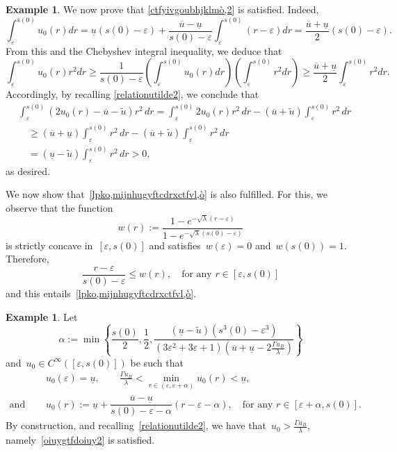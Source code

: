\documentclass[12pt,a4paper,intlimits,sumlimits]{amsart}
\theoremstyle{definition}
\newtheorem{example}[definition]{Example}
\theoremstyle{plain}
\numberwithin{equation}{section}
\renewcommand{\le}{\leqslant}
\renewcommand{\ge}{\geqslant}
\begin{document}
\begin{appendix}
\begin{example}
We now prove that \eqref{ctfyivgoubhjklmò,2} is satisfied.
Indeed,
\[
\int_{\varepsilon}^{s(0)} u_0(r) dr = \underline u (s(0)-\varepsilon) +\dfrac{\overline u-\underline u}{s(0)-\varepsilon}\int_{\varepsilon}^{s(0)} (r-\varepsilon) dr=\dfrac{\overline u +\underline u}{2}(s(0)-\varepsilon).
\]
From this and the Chebyshev integral inequality, we deduce that
\[
\int_{\varepsilon}^{s(0)} u_0(r) r^2 dr\ge\dfrac{1}{s(0)-\varepsilon}\left(\int_{\varepsilon}^{s(0)} u_0(r) dr\right)\left(\int_{\varepsilon}^{s(0)} r^2 dr\right)\ge \dfrac{\overline u +\underline u}{2} \int_{\varepsilon}^{s(0)} r^2 dr.
\]
Accordingly,  by recalling \eqref{relationutilde2}, we conclude that
\[
\begin{split}
&\int_\varepsilon^{s(0)} (2 u_0(r)-\overline{u} -\widetilde u) r^2\, dr = \int_\varepsilon^{s(0)} 2u_0(r) r^2\, dr -(\overline u+\widetilde u)\int_\varepsilon^{s(0)} r^2 \, dr\\
&\quad\ge (\overline u+\underline u)\int_\varepsilon^{s(0)} r^2 \, dr - (\overline u+\widetilde u)\int_\varepsilon^{s(0)} r^2 \, dr\\
&\quad = (\underline u-\widetilde u)\int_\varepsilon^{s(0)} r^2 \, dr>0, 
\end{split}
\]
as desired.

We now show that~\eqref{lpko,mijnhugyftcdrxctfvl,ò} is also fulfilled.
For this, we observe that the function
$$w(r):=\dfrac{1-e^{-\sqrt\lambda(r-\varepsilon)}}{1-e^{-\sqrt\lambda (s(0)-\varepsilon)}}$$ is strictly concave in~$[\varepsilon, s(0)]$ and satisfies~$ w(\varepsilon)=0$ and~$w(s(0))=1$.
Therefore,
$$ \dfrac{r-\varepsilon}{s(0)-\varepsilon}\le w(r), \quad {\mbox{for any }}r\in [\varepsilon, s(0)]$$
and this entails~\eqref{lpko,mijnhugyftcdrxctfvl,ò}.
\end{example}

\begin{example}
Let 
\begin{equation}\label{xfgyucvghjcvhj1}
\alpha:=\min\left\{\frac{s(0)}{2},\frac{1}{2},\frac{(\underline u-\widetilde u)(s^3(0)-\varepsilon^3)}{(3\varepsilon^2+3\varepsilon+1)(\overline u+\underline u-2\frac{\Gamma u_B}{\lambda})}\right\}
\end{equation} and~$u_0\in C^\infty([\varepsilon,s(0)])$ be such that 
\[
\begin{aligned}
&u_0(\varepsilon)=\underline u,
\qquad \frac{\Gamma u_B}{\lambda}<\min_{r\in(\varepsilon,\varepsilon+\alpha)}u_0(r)<\underline u, \\
\mbox{and }\quad & u_0(r):=\underline u +\dfrac{\overline u -\underline u}{s(0)-\varepsilon-\alpha}(r-\varepsilon-\alpha),\quad {\mbox{for any }}
r\in [\varepsilon+\alpha, s(0)].
\end{aligned}
\]
By construction, and recalling~\eqref{relationutilde2}, we have that~$u_0>\frac{\Gamma u_B}{\lambda}$, namely~\eqref{oiuygtfdoiuy2} is satisfied.


\end{example}
\end{appendix}
\end{document}
